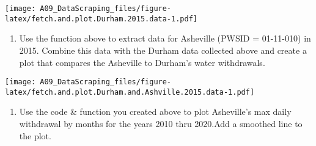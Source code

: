 \documentclass[
]{article}
\newenvironment{Shaded}{\begin{snugshade}}{\end{snugshade}}
\newcommand{\AttributeTok}[1]{\textcolor[rgb]{0.77,0.63,0.00}{#1}}
\newcommand{\CommentTok}[1]{\textcolor[rgb]{0.56,0.35,0.01}{\textit{#1}}}
\newcommand{\DecValTok}[1]{\textcolor[rgb]{0.00,0.00,0.81}{#1}}
\newcommand{\FunctionTok}[1]{\textcolor[rgb]{0.00,0.00,0.00}{#1}}
\newcommand{\NormalTok}[1]{#1}
\newcommand{\OtherTok}[1]{\textcolor[rgb]{0.56,0.35,0.01}{#1}}
\newcommand{\SpecialCharTok}[1]{\textcolor[rgb]{0.00,0.00,0.00}{#1}}
\newcommand{\StringTok}[1]{\textcolor[rgb]{0.31,0.60,0.02}{#1}}
\providecommand{\tightlist}{%
  \setlength{\itemsep}{0pt}\setlength{\parskip}{0pt}}
\begin{document}
\texttt{[image: A09\_DataScraping\_files/figure-latex/fetch.and.plot.Durham.2015.data-1.pdf]}

\begin{enumerate}
\def\labelenumi{\arabic{enumi}.}
\setcounter{enumi}{7}
\tightlist
\item
  Use the function above to extract data for Asheville (PWSID =
  01-11-010) in 2015. Combine this data with the Durham data collected
  above and create a plot that compares the Asheville to Durham's water
  withdrawals.
\end{enumerate}

\begin{Shaded}
\end{Shaded}

\texttt{[image: A09\_DataScraping\_files/figure-latex/fetch.and.plot.Durham.and.Ashville.2015.data-1.pdf]}

\begin{enumerate}
\def\labelenumi{\arabic{enumi}.}
\setcounter{enumi}{8}
\tightlist
\item
  Use the code \& function you created above to plot Asheville's max
  daily withdrawal by months for the years 2010 thru 2020.Add a smoothed
  line to the plot.
\end{enumerate}
\end{document}

